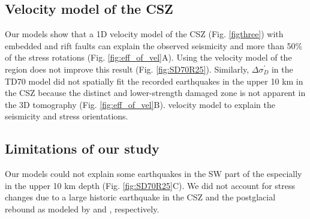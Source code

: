 \documentclass[draft]{agujournal2018}
\begin{document}


\subsection{Velocity model of the CSZ}
Our models show that a 1D velocity model of the CSZ \citep{lamontagne1999} (Fig. \ref{figthree}) with embedded  and rift faults can explain the observed seismicity and more than 50$\%$ of the stress rotations (Fig. \ref{fig:eff_of_vel}A). Using the velocity model of the  region does not improve this result (Fig. \ref{fig:SD70R25}). Similarly, $\Delta\sigma_{D}^\prime$ in the TD70 model did not spatially fit the recorded earthquakes in the upper 10 km in the CSZ because the distinct and lower-strength damaged zone is not apparent in the 3D tomography \citep{Powell_2017} (Fig. \ref{fig:eff_of_vel}B). \citet{lamontagne1999}  velocity model to explain the seismicity and stress orientations.

\subsection{Limitations of our study}
Our models could not explain some earthquakes in the SW part of the  especially in the upper 10 km depth (Fig. \ref{fig:SD70R25}C). We did not account for stress changes due to a large historic earthquake in the CSZ and the postglacial rebound as modeled by \citet{Fereidoni2014} and \citet{Mazzotti_GPS2005}, respectively.
\end{document}
